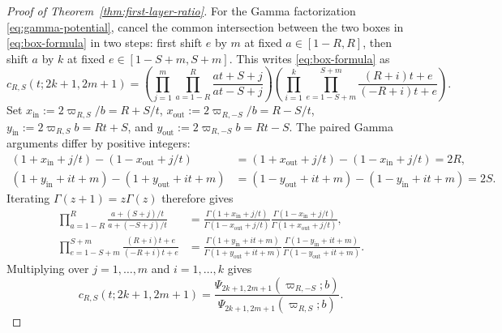 \documentclass[twoside,10pt]{article}
\numberwithin{equation}{section}
\theoremstyle{slbody}
\theoremstyle{definition}
\theoremstyle{remark}
\begin{document}
\begin{proof}[Proof of Theorem~\ref{thm:first-layer-ratio}]
For the Gamma factorization \eqref{eq:gamma-potential}, cancel the common
intersection between the two boxes in \eqref{eq:box-formula} in two steps:
first shift \(e\) by \(m\) at fixed \(a\in[1-R,R]\), then shift \(a\) by \(k\)
at fixed \(e\in[1-S+m,S+m]\).  This writes \eqref{eq:box-formula} as
\begin{equation}\label{eq:two-step-box}
 c_{R,S}(t;2k+1,2m+1)
 =\left(\prod_{j=1}^m\prod_{a=1-R}^R\frac{at+S+j}{at-S+j}\right)
  \left(\prod_{i=1}^k\prod_{e=1-S+m}^{S+m}\frac{(R+i)t+e}{(-R+i)t+e}\right).
\end{equation}
Set \(x_{\mathrm{in}}:=2\varpi_{R,S}/b=R+S/t\), \(x_{\mathrm{out}}:=2\varpi_{R,-S}/b=R-S/t\),
\(y_{\mathrm{in}}:=2\varpi_{R,S}b=Rt+S\), and \(y_{\mathrm{out}}:=2\varpi_{R,-S}b=Rt-S\).
The paired Gamma arguments differ by positive integers:
\begin{align*}
 (1+x_{\mathrm{in}}+j/t)-(1-x_{\mathrm{out}}+j/t)
 &=(1+x_{\mathrm{out}}+j/t)-(1-x_{\mathrm{in}}+j/t)=2R,\\
 (1+y_{\mathrm{in}}+it+m)-(1+y_{\mathrm{out}}+it+m)
 &=(1-y_{\mathrm{out}}+it+m)-(1-y_{\mathrm{in}}+it+m)=2S.
\end{align*}
Iterating \(\Gamma(z+1)=z\Gamma(z)\) therefore gives
\begin{align*}
 \prod_{a=1-R}^R\frac{a+(S+j)/t}{a+(-S+j)/t}
 &=\frac{\Gamma(1+x_{\mathrm{in}}+j/t)}{\Gamma(1-x_{\mathrm{out}}+j/t)}
   \frac{\Gamma(1-x_{\mathrm{in}}+j/t)}{\Gamma(1+x_{\mathrm{out}}+j/t)},\\
 \prod_{e=1-S+m}^{S+m}\frac{(R+i)t+e}{(-R+i)t+e}
 &=\frac{\Gamma(1+y_{\mathrm{in}}+it+m)}{\Gamma(1+y_{\mathrm{out}}+it+m)}
   \frac{\Gamma(1-y_{\mathrm{in}}+it+m)}{\Gamma(1-y_{\mathrm{out}}+it+m)}.
\end{align*}
Multiplying over \(j=1,\ldots,m\) and \(i=1,\ldots,k\) gives
\[
 c_{R,S}(t;2k+1,2m+1)
 =\frac{\Psi_{2k+1,2m+1}(\varpi_{R,-S};b)}{\Psi_{2k+1,2m+1}(\varpi_{R,S};b)}.
\]
\end{proof}
\end{document}
